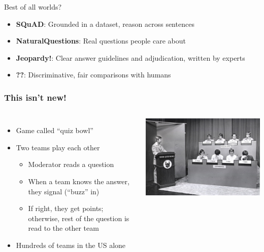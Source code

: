 \documentclass[xcolor=dvipsnames,xcolor=table]{beamer}
\begin{document}
\begin{frame}{Best of all worlds?}

  \begin{itemize}
    \item {\bf SQuAD}:  Grounded in a dataset, reason across sentences
    \item {\bf NaturalQuestions}: Real questions people care about
    \item {\bf Jeopardy!}: Clear answer guidelines and adjudication, written by experts
    \item {\bf ??}: Discriminative, fair comparisons with humans
  \end{itemize}

\end{frame}

\begin{frame}
	\frametitle{This isn't new!}
	\begin{columns}

	\begin{itemize}
		\item Game called ``quiz bowl''
		\item Two teams play each other
		\begin{itemize}
			\item Moderator reads a question
			\item When a team knows the answer, they signal (``buzz'' in)
			\item If right, they get points; otherwise, rest of the question is read to the other team
		\end{itemize}
		\item Hundreds of teams in the US alone
	\end{itemize}

	\includegraphics{qb/quizbowl}

	\end{columns}

\end{frame}
\end{document}
